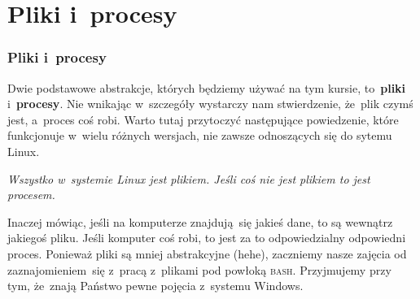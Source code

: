 \documentclass[10pt,t]{beamer}
\begin{document}
\section{Pliki i~procesy}



\begin{frame}
  \frametitle{Pliki i~procesy}


  Dwie podstawowe abstrakcje, których będziemy używać na tym kursie,
  to~\textbf{pliki} i~\textbf{procesy}. Nie wnikając w~szczegóły wystarczy
  nam stwierdzenie, że~plik czymś jest, a~proces coś robi. Warto tutaj
  przytoczyć następujące powiedzenie, które funkcjonuje w~wielu różnych
  wersjach, nie zawsze odnoszących się do sytemu Linux.

  \textit{Wszystko w~systemie Linux jest plikiem. Jeśli coś nie jest
    plikiem to jest procesem.}

  Inaczej mówiąc, jeśli na komputerze znajdują~się jakieś dane, to są
  wewnątrz jakiegoś pliku. Jeśli komputer coś robi, to jest za to
  odpowiedzialny odpowiedni proces. Ponieważ pliki są mniej abstrakcyjne
  (hehe), zaczniemy nasze zajęcia od zaznajomieniem~się z~pracą z~plikami
  pod powłoką \textsc{bash}. Przyjmujemy przy tym, że~znają Państwo pewne
  pojęcia z~systemu Windows.

\end{frame}














\end{document}
